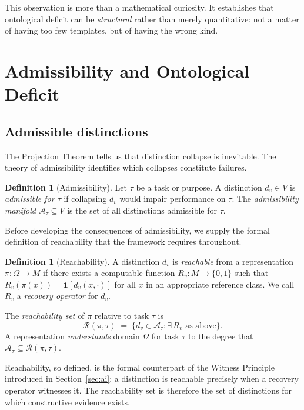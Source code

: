 \documentclass[11pt, a4paper]{article}
\theoremstyle{plain}
\theoremstyle{definition}
\newtheorem{definition}[theorem]{Definition}
\theoremstyle{remark}
\newcommand{\Adm}{\mathcal{A}}
\newcommand{\Reach}{\mathcal{R}}
\newcommand{\Proj}{\pi}
\begin{document}
This observation is more than a mathematical curiosity.
It establishes that ontological deficit can be \emph{structural}
rather than merely quantitative: not a matter of having too few
templates, but of having the wrong kind.

\section{Admissibility and Ontological Deficit}
\label{sec:admissibility}

\subsection{Admissible distinctions}

The Projection Theorem tells us that distinction collapse is
inevitable. The theory of admissibility identifies which collapses
constitute failures.

\begin{definition}[Admissibility]
\label{def:adm}
Let $\tau$ be a task or purpose. A distinction $d_v \in V$ is
\emph{admissible for $\tau$} if collapsing $d_v$ would impair
performance on $\tau$.
The \emph{admissibility manifold} $\Adm_\tau \subseteq V$ is the set
of all distinctions admissible for $\tau$.
\end{definition}

Before developing the consequences of admissibility, we supply the
formal definition of reachability that the framework requires throughout.

\begin{definition}[Reachability]
\label{def:reach}
A distinction $d_v$ is \emph{reachable} from a representation
$\Proj : \Omega \to M$ if there exists a computable function
$R_v : M \to \{0,1\}$ such that $R_v(\Proj(x)) = \mathbf{1}[d_v(x,\cdot)]$
for all $x$ in an appropriate reference class.
We call $R_v$ a \emph{recovery operator} for $d_v$.

The \emph{reachability set} of $\Proj$ relative to task $\tau$ is
\[
  \Reach(\Proj, \tau)
  \;=\;
  \bigl\{d_v \in \Adm_\tau : \exists\, R_v \text{ as above}\bigr\}.
\]
A representation \emph{understands} domain $\Omega$ for task $\tau$
to the degree that $\Adm_\tau \subseteq \Reach(\Proj, \tau)$.
\end{definition}

Reachability, so defined, is the formal counterpart of the Witness
Principle introduced in Section~\ref{sec:ai}: a distinction is
reachable precisely when a recovery operator witnesses it.
The reachability set is therefore the set of distinctions for which
constructive evidence exists.
\end{document}
